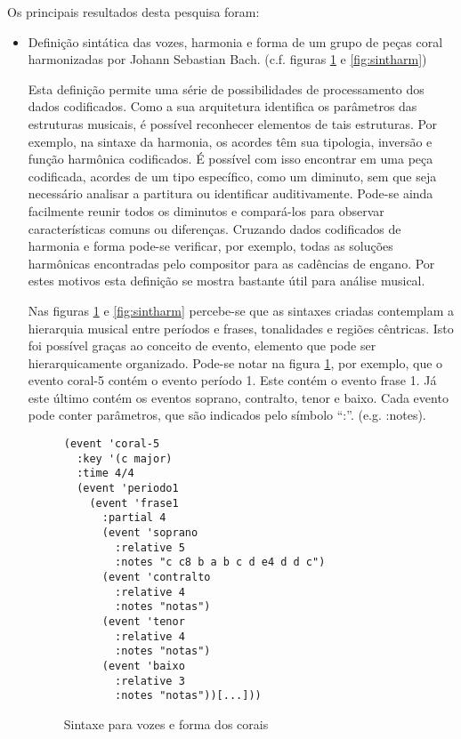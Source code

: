 \documentclass[11pt]{article}
\begin{document}

Os principais resultados desta pesquisa foram:

\begin{itemize}
\item Definição sintática das vozes, harmonia e forma de um grupo de
  peças coral harmonizadas por Johann Sebastian Bach. (c.f. figuras
  \ref{fig:sintform} e \ref{fig:sintharm})

  Esta definição permite uma série de possibilidades de processamento
  dos dados codificados.  Como a sua arquitetura identifica os
  parâmetros das estruturas musicais, é possível reconhecer elementos
  de tais estruturas. Por exemplo, na sintaxe da harmonia, os acordes
  têm sua tipologia, inversão e função harmônica codificados. É
  possível com isso encontrar em uma peça codificada, acordes de um
  tipo específico, como um diminuto, sem que seja necessário analisar
  a partitura ou identificar auditivamente. Pode-se ainda facilmente
  reunir todos os diminutos e compará-los para observar
  características comuns ou diferenças. Cruzando dados codificados de
  harmonia e forma pode-se verificar, por exemplo, todas as soluções
  harmônicas encontradas pelo compositor para as cadências de engano.
  Por estes motivos esta definição se mostra bastante útil para
  análise musical.

  Nas figuras \ref{fig:sintform} e \ref{fig:sintharm} percebe-se que
  as sintaxes criadas contemplam a hierarquia musical entre períodos e
  frases, tonalidades e regiões cêntricas. Isto foi possível graças ao
  conceito de evento, elemento que pode ser hierarquicamente
  organizado.  Pode-se notar na figura \ref{fig:sintform}, por
  exemplo, que o evento coral-5 contém o evento período 1. Este contém
  o evento frase 1. Já este último contém os eventos soprano,
  contralto, tenor e baixo. Cada evento pode conter parâmetros, que
  são indicados pelo símbolo ``:''. (e.g. :notes).

\begin{figure}
  \centering
  \footnotesize
\begin{verbatim}
(event 'coral-5
  :key '(c major)
  :time 4/4
  (event 'periodo1
    (event 'frase1
      :partial 4
      (event 'soprano
        :relative 5
        :notes "c c8 b a b c d e4 d d c")
      (event 'contralto
        :relative 4
        :notes "notas")
      (event 'tenor
        :relative 4
        :notes "notas")
      (event 'baixo
        :relative 3
        :notes "notas"))[...]))
\end{verbatim}
  \caption{Sintaxe para vozes e forma dos corais}
  \label{fig:sintform}
\end{figure}


\end{itemize}
\end{document}

